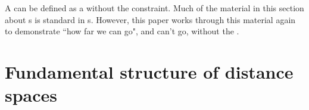 
A   can be defined as a  
without the  constraint.
Much of the material in this section about s is
standard in s.
However, this paper works through this material again to demonstrate ``how far we can go", and can't go, 
without the .

\section{Fundamental structure of distance spaces}
\label{sec:distance}
\label{sec:dspace}
